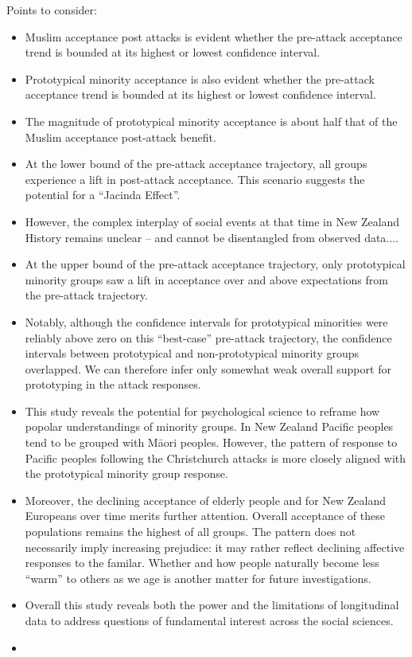 \documentclass[
  singlecolumn]{report}
\providecommand{\tightlist}{%
  \setlength{\itemsep}{0pt}\setlength{\parskip}{0pt}}\usepackage{longtable,booktabs,array}
\begin{document}
Points to consider:

\begin{itemize}
\tightlist
\item
  Muslim acceptance post attacks is evident whether the pre-attack
  acceptance trend is bounded at its highest or lowest confidence
  interval.
\item
  Prototypical minority acceptance is also evident whether the
  pre-attack acceptance trend is bounded at its highest or lowest
  confidence interval.
\item
  The magnitude of prototypical minority acceptance is about half that
  of the Muslim acceptance post-attack benefit.
\item
  At the lower bound of the pre-attack acceptance trajectory, all groups
  experience a lift in post-attack acceptance. This scenario suggests
  the potential for a ``Jacinda Effect''.
\item
  However, the complex interplay of social events at that time in New
  Zealand History remains unclear -- and cannot be disentangled from
  observed data.\(\dots\)
\item
  At the upper bound of the pre-attack acceptance trajectory, only
  prototypical minority groups saw a lift in acceptance over and above
  expectations from the pre-attack trajectory.
\item
  Notably, although the confidence intervals for prototypical minorities
  were reliably above zero on this ``best-case'' pre-attack trajectory,
  the confidence intervals between prototypical and non-prototypical
  minority groups overlapped. We can therefore infer only somewhat weak
  overall support for prototyping in the attack responses.
\item
  This study reveals the potential for psychological science to reframe
  how popolar understandings of minority groups. In New Zealand Pacific
  peoples tend to be grouped with Māori peoples. However, the pattern of
  response to Pacific peoples following the Christchurch attacks is more
  closely aligned with the prototypical minority group response.
\item
  Moreover, the declining acceptance of elderly people and for New
  Zealand Europeans over time merits further attention. Overall
  acceptance of these populations remains the highest of all groups. The
  pattern does not necessarily imply increasing prejudice: it may rather
  reflect declining affective responses to the familar. Whether and how
  people naturally become less ``warm'' to others as we age is another
  matter for future investigations.
\item
  Overall this study reveals both the power and the limitations of
  longitudinal data to address questions of fundamental interest across
  the social sciences.
\item
\end{itemize}
\end{document}

